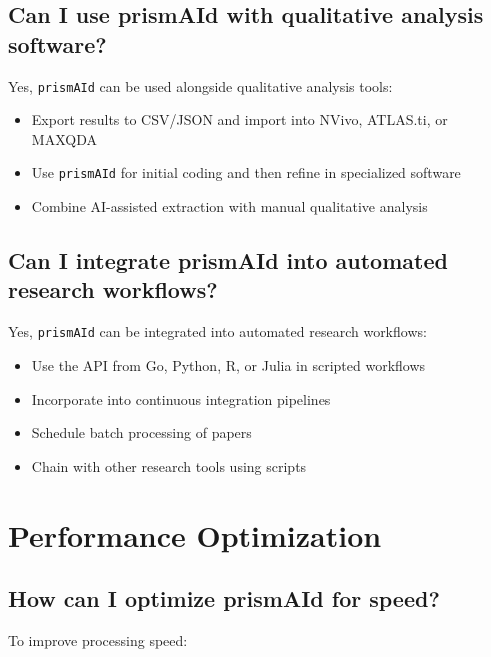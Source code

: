 \subsection{Can I use prismAId with qualitative analysis software?}

Yes, \texttt{prismAId} can be used alongside qualitative analysis tools:

\begin{itemize}
    \item Export results to CSV/JSON and import into NVivo, ATLAS.ti, or MAXQDA
    \item Use \texttt{prismAId} for initial coding and then refine in specialized software
    \item Combine AI-assisted extraction with manual qualitative analysis
\end{itemize}

\subsection{Can I integrate prismAId into automated research workflows?}

Yes, \texttt{prismAId} can be integrated into automated research workflows:

\begin{itemize}
    \item Use the API from Go, Python, R, or Julia in scripted workflows
    \item Incorporate into continuous integration pipelines
    \item Schedule batch processing of papers
    \item Chain with other research tools using scripts
\end{itemize}

\section{Performance Optimization}

\subsection{How can I optimize prismAId for speed?}

To improve processing speed:

